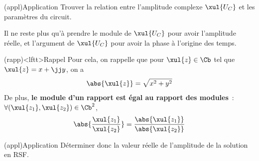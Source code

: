 \documentclass[../../main/main.tex]{subfiles}
\begin{document}
\begin{tcb}(appl){Application}
	Trouver la relation entre l'amplitude complexe $\xul{U_C}$ et les paramètres
	du circuit.
	\tcblower
	\begin{isd}[lefthand ratio=.3]
		\tcblower
	\end{isd}
\end{tcb}
Il ne reste plus qu'à prendre le module de $\xul{U_C}$ pour avoir l'amplitude
réelle, et l'argument de $\xul{U_C}$ pour avoir la phase à l'origine des
temps.
\begin{tcb}[sidebyside](rapp)<lftt>{Rappel}
	Pour cela, on rappelle que pour $\xul{z} \in \Cb$ tel que $\xul{z} = x + \jj
		y$, on a
	\[ \abs{\xul{z}} = \sqrt{x^2 + y^2}\]
	\tcblower
	De plus, \textbf{le module d'un rapport est égal au rapport des modules}~:
	$\forall (\xul{z_1}, \xul{z_2}) \in \Cb^2$,
	\[
		\abs{\frac{\xul{z_1}}{\xul{z_2}}} =
		\frac{\abs{\xul{z_1}}}{\abs{\xul{z_2}}}
	\]
\end{tcb}
\begin{tcb}(appl){Application}
	Déterminer donc la valeur réelle de l'amplitude de la solution en RSF.
	\tcblower
\end{tcb}
\end{document}
